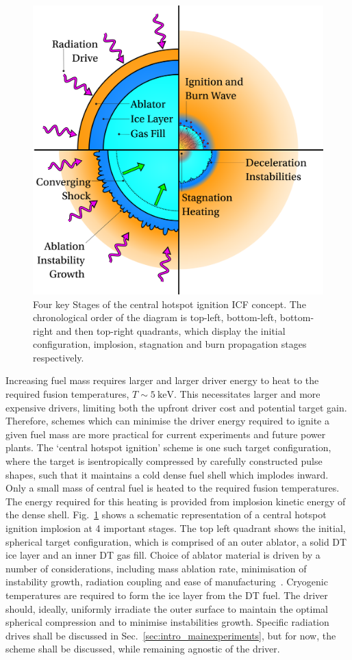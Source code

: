 \begin{figure}[t!]
    \includegraphics[width=0.7\linewidth]{Introduction/Images/hotspot ignition white.png}
    \centering
    \caption{Four key Stages of the central hotspot ignition \ac{ICF} concept.
    The chronological order of the diagram is top-left, bottom-left, bottom-right and then top-right quadrants, which display the initial configuration, implosion, stagnation and burn propagation stages respectively.
    }%
    \label{fig:intro_hotspot}
\end{figure}

Increasing fuel mass requires larger and larger driver energy to heat to the required fusion temperatures, $T\sim5\ \text{keV}$.
This necessitates larger and more expensive drivers, limiting both the upfront driver cost and potential target gain.
Therefore, schemes which can minimise the driver energy required to ignite a given fuel mass are more practical for current experiments and future power plants.
The `central hotspot ignition' scheme is one such target configuration, where the target is isentropically compressed by carefully constructed pulse shapes, such that it maintains a cold dense fuel shell which implodes inward.
Only a small mass of central fuel is heated to the required fusion temperatures.
The energy required for this heating is provided from implosion kinetic energy of the dense shell.
Fig.~\ref{fig:intro_hotspot} shows a schematic representation of a central hotspot ignition implosion at 4 important stages.
The top left quadrant shows the initial, spherical target configuration, which is comprised of an outer ablator, a solid DT ice layer and an inner DT gas fill.
Choice of ablator material is driven by a number of considerations, including mass ablation rate, minimisation of instability growth, radiation coupling and ease of manufacturing~\cite{lafon_directdriveignition_2015,kline_first_2016,hu_laserdirectdrive_2023,casey_performance_2015}.
Cryogenic temperatures are required to form the ice layer from the DT fuel.
The driver should, ideally, uniformly irradiate the outer surface to maintain the optimal spherical compression and to minimise instabilities growth.
Specific radiation drives shall be discussed in Sec.~\ref{sec:intro_mainexperiments}, but for now, the scheme shall be discussed, while remaining agnostic of the driver.

